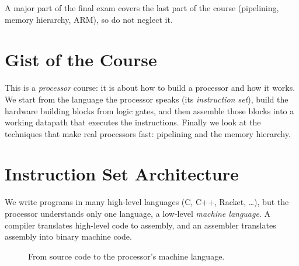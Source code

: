 \begin{important}
A major part of the final exam covers the last part of the course
(pipelining, memory hierarchy, ARM), so do not neglect it.
\end{important}

\section{Gist of the Course}

This is a \emph{processor} course: it is about how to build a processor and
how it works. We start from the language the processor speaks (its
\emph{instruction set}), build the hardware building blocks from logic
gates, and then assemble those blocks into a working datapath that executes
the instructions. Finally we look at the techniques that make real processors
fast: pipelining and the memory hierarchy.

\section{Instruction Set Architecture}

We write programs in many high-level languages (C, C++, Racket, \ldots), but
the processor understands only one language, a low-level \emph{machine
language}. A compiler translates high-level code to assembly, and an
assembler translates assembly into binary machine code.

\begin{figure}[H]
\centering
{}
\caption{From source code to the processor's machine language.}
\end{figure}


